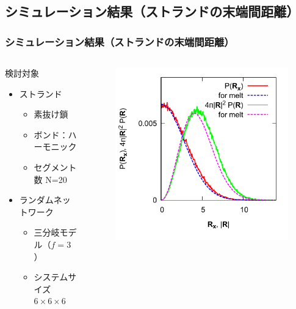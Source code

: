 \documentclass[11pt, dvipdfmx]{beamer}
\begin{document}
\subsection{シミュレーション結果（ストランドの末端間距離）}
\begin{frame}
\frametitle{シミュレーション結果（ストランドの末端間距離）}
\vspace{-3mm}
\begin{columns}[totalwidth=\linewidth]
\begin{block}{検討対象}
\begin{itemize}
\item
ストランド
	\begin{itemize}
	\item 
	素抜け鎖
 	\item 
 	ボンド：ハーモニック
 	\item
 	セグメント数 N=20 
	\end{itemize}
\item
ランダムネットワーク
	\begin{itemize}
	\item
	三分岐モデル（$f=3$）
	\item
	システムサイズ\\
	$6\times 6\times 6$
	\end{itemize}
\end{itemize}
\end{block}
\begin{figure}
\includegraphics[width=\columnwidth]{./fig/PR.pdf}

\end{figure}
\end{columns}
\end{frame}
\end{document}
